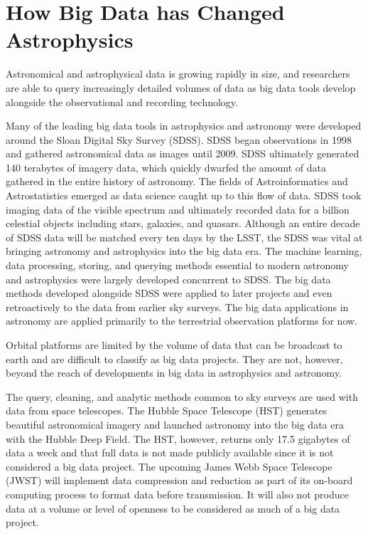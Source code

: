 \documentclass[sigconf]{acmart}
\begin{document}
 
\section{How Big Data has Changed Astrophysics}
Astronomical and astrophysical data is growing rapidly in size, and researchers are able to query increasingly detailed volumes of data as big data tools develop alongside the observational and recording technology. 

Many of the leading big data tools in astrophysics and astronomy were developed around the Sloan Digital Sky Survey (SDSS)\cite{Economist2010}. SDSS began observations in 1998 and gathered astronomical data as images until 2009. SDSS ultimately generated 140 terabytes of imagery data, which quickly dwarfed the amount of data gathered in the entire history of astronomy\cite{Economist2010}. The fields of Astroinformatics and Astrostatistics\cite{Feigelson2012} emerged as data science caught up to this flow of data. SDSS took imaging data of the visible spectrum and ultimately recorded data for a billion celestial objects including stars, galaxies, and quasars. Although an entire decade of SDSS data will be matched every ten days by the LSST, the SDSS was vital at bringing astronomy and astrophysics into the big data era\cite{Economist2010}. The machine learning, data processing, storing, and querying methods essential to modern astronomy and astrophysics were largely developed concurrent to SDSS. The big data methods developed alongside SDSS were applied to later projects and even retroactively to the data from earlier sky surveys. The big data applications in astronomy are applied primarily to the terrestrial observation platforms for now.

Orbital platforms are limited by the volume of data that can be broadcast to earth and are difficult to classify as big data projects. They are not, however, beyond the reach of developments in big data in astrophysics and astronomy.

The query, cleaning, and analytic methods common to sky surveys are used with data from space telescopes. The Hubble Space Telescope (HST) generates beautiful astronomical imagery and launched astronomy into the big data era with the Hubble Deep Field\cite{HubbleSite.org2016}. The HST, however, returns only 17.5 gigabytes of data a week and that full data is not made publicly available since it is not considered a big data project. The upcoming James Webb Space Telescope (JWST) will implement data compression and reduction as part of its on-board computing process to format data before transmission\cite{Borowitz2011}. It will also not produce data at a volume or level of openness to be considered as much of a big data project.\\
\end{document}
